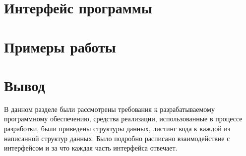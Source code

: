 \section{Интерфейс программы}

\section{Примеры работы}

\section{Вывод}
\hspace{0.6cm}В данном разделе были рассмотрены требования к разрабатываемому программному обеспечению, средства реализации, использованные в процессе разработки, были приведены структуры данных, листинг кода к каждой из написанной структур данных. Было подробно расписано взаимодействие с интерфейсом и за что каждая часть интерфейса отвечает.
